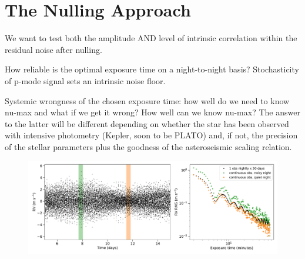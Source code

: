 \documentclass[modern]{aastex62}
\begin{document}




\section{The Nulling Approach}
\label{s:nulling}

We want to test both the amplitude AND level of intrinsic correlation within the residual noise after nulling.

How reliable is the optimal exposure time on a night-to-night basis? Stochasticity of p-mode signal sets an intrinsic noise floor.

Systemic wrongness of the chosen exposure time: how well do we need to know nu-max and what if we get it wrong? How well can we know nu-max? The answer to the latter will be different depending on whether the star has been observed with intensive photometry (Kepler, soon to be PLATO) and, if not, the precision of the stellar parameters plus the goodness of the asteroseismic scaling relation.

\begin{figure}
    \centering
    \includegraphics[width=1.1\linewidth]{figures/binning_test.pdf}
    \caption{}
    \label{fig:binning-sim}
\end{figure}
\end{document}
